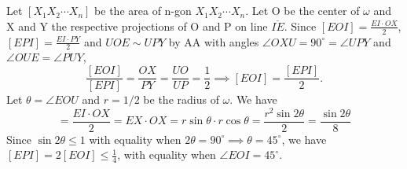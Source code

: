 \documentclass{article}
\begin{document}
    \section{}\label{sec:3}
    Let $[X_1X_2\cdots X_n]$ be the area of n-gon $X_1X_2\cdots X_n$. Let O be the center of $\omega$ and X and Y the respective projections of O and P on line $\overline{IE}$. Since $[EOI]=\frac{EI\cdot OX}{2}$, $[EPI]=\frac{EI\cdot PY}{2}$ and $UOE\sim UPY$ by AA with angles $\angle OXU=90^\circ =\angle UPY$ and $\angle OUE=\angle PUY$,
    \begin{equation}
        \frac{[EOI]}{[EPI]}=\frac{OX}{PY}=\frac{UO}{UP}=\frac{1}{2} \implies [EOI]=\frac{[EPI]}{2}.
    \end{equation}
    Let $\theta=\angle EOU$ and $r=1/2$ be the radius of $\omega$. We have
    \begin{equation}
        [EOI]=\frac{EI\cdot OX}{2}=EX\cdot OX=r\sin{\theta}\cdot r\cos{\theta}=\frac{r^2\sin{2\theta}}{2}=\frac{\sin{2\theta}}{8}
    \end{equation}
    Since $\sin{2\theta}\leq 1$ with equality when $2\theta=90^\circ\implies \theta=45^\circ$, we have $[EPI]=2[EOI]\leq \frac{1}{4}$, with equality when $\angle EOI=45^\circ$.
    \section{}\label{sec:4}

    \section{}\label{sec:5}
\end{document}
